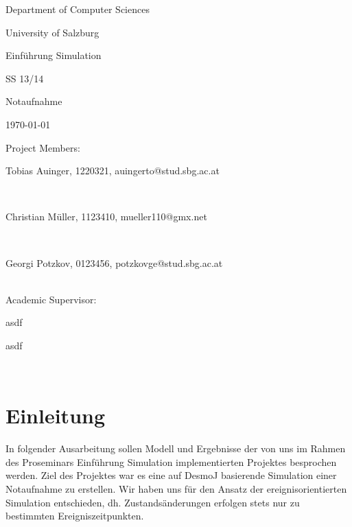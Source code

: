 \documentclass[12pt,fleqn,a4paper]{article}
\begin{document}
\begin{titlepage}%
\vspace{2cm}
\centerline{
\large{Department of Computer Sciences}}
\vspace{0.2cm}
\centerline{\large{University of Salzburg}}%
\vspace{2cm}

\centerline{\large{Einf\"{u}hrung Simulation}}
\centerline{SS 13/14}
\vspace{1cm}

\centerline{\huge{Notaufnahme}}
\vspace{1cm}

\vspace{0.4cm}%
\centerline{\today}
\vspace{5cm}%

\vspace{0.2cm}
Project Members:\\
\centerline{Tobias Auinger, 1220321, auingerto@stud.sbg.ac.at}\\
\centerline{Christian M\"{u}ller, 1123410, mueller110@gmx.net}\\
\centerline{Georgi Potzkov, 0123456, potzkovge@stud.sbg.ac.at}
\vspace {0.8cm}\\

Academic Supervisor: \\
\centerline{asdf}
\centerline{asdf}
\vspace{0.8cm}\\
\clearpage
\end{titlepage}


\clearpage
\pagestyle{headings}
\setcounter{page}{1}
\setcounter{page}{1}

\tableofcontents
\newpage

\section{Einleitung}
In folgender Ausarbeitung sollen  Modell und Ergebnisse der von uns im Rahmen des Proseminars Einf\"{u}hrung Simulation implementierten Projektes besprochen werden.
Ziel des Projektes war es eine auf DesmoJ basierende Simulation einer Notaufnahme zu erstellen. Wir haben uns f\"{u}r den Ansatz der ereignisorientierten Simulation entschieden, dh. Zustands\"{a}nderungen erfolgen stets nur zu bestimmten Ereigniszeitpunkten.
\end{document}
